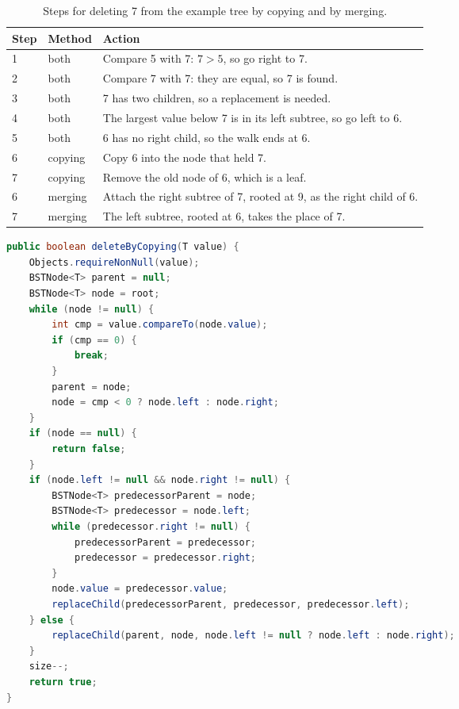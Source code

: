 \begin{table}[H]
\centering
\small
\caption{Steps for deleting 7 from the example tree by copying and by merging.}
\label{tab:delete7}
\begin{tabularx}{\textwidth}{p{1.2cm} p{2.4cm} X}
\toprule
Step & Method & Action \\
\midrule
1 & both & Compare 5 with 7: $7 > 5$, so go right to 7. \\
2 & both & Compare 7 with 7: they are equal, so 7 is found. \\
3 & both & 7 has two children, so a replacement is needed. \\
4 & both & The largest value below 7 is in its left subtree, so go left to 6. \\
5 & both & 6 has no right child, so the walk ends at 6. \\
6 & copying & Copy 6 into the node that held 7. \\
7 & copying & Remove the old node of 6, which is a leaf. \\
6 & merging & Attach the right subtree of 7, rooted at 9, as the right child of 6. \\
7 & merging & The left subtree, rooted at 6, takes the place of 7. \\
\bottomrule
\end{tabularx}
\end{table}

\begin{lstlisting}[language=Java]
public boolean deleteByCopying(T value) {
    Objects.requireNonNull(value);
    BSTNode<T> parent = null;
    BSTNode<T> node = root;
    while (node != null) {
        int cmp = value.compareTo(node.value);
        if (cmp == 0) {
            break;
        }
        parent = node;
        node = cmp < 0 ? node.left : node.right;
    }
    if (node == null) {
        return false;
    }
    if (node.left != null && node.right != null) {
        BSTNode<T> predecessorParent = node;
        BSTNode<T> predecessor = node.left;
        while (predecessor.right != null) {
            predecessorParent = predecessor;
            predecessor = predecessor.right;
        }
        node.value = predecessor.value;
        replaceChild(predecessorParent, predecessor, predecessor.left);
    } else {
        replaceChild(parent, node, node.left != null ? node.left : node.right);
    }
    size--;
    return true;
}
\end{lstlisting}

